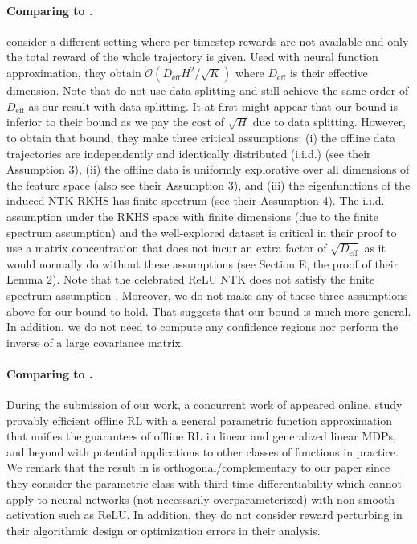 \documentclass{article} \usepackage{iclr2023/iclr2023_conference,times}
\begin{document}
\paragraph{Comparing to \cite{xu2022provably}.} \citet{xu2022provably} consider a different setting where per-timestep rewards are not available and only the total reward of the whole trajectory is given. Used with neural function approximation, they obtain $\tilde{\mathcal{O}}(D_{\textrm{eff}} H^2 / \sqrt{K})$ where $D_{\textrm{eff}}$ is their effective dimension. Note that \citet{xu2022provably} do not use data splitting and still achieve the same order of $D_{\textrm{eff}}$ as our result with data splitting. It at first might appear that our bound is inferior to their bound as we pay the cost of $\sqrt{H}$ due to data splitting. However, to obtain that bound, they make three critical assumptions: (i) the offline data trajectories are independently and identically distributed (i.i.d.) (see their Assumption 3), (ii) the offline data is uniformly explorative over all dimensions of the feature space (also see their Assumption 3), and (iii) the eigenfunctions of the induced NTK RKHS has finite spectrum (see their Assumption 4). The i.i.d. assumption under the RKHS space with finite dimensions (due to the finite spectrum assumption) and the well-explored dataset is critical in their proof to use a matrix concentration that does not incur an extra factor of $\sqrt{D_{\textrm{eff}}}$ as it would normally do without these assumptions (see Section E, the proof of their Lemma 2). Note that the celebrated ReLU NTK does not satisfy the finite spectrum assumption \citep{bietti2019inductive}. Moreover, we do not make any of these three assumptions above for our bound to hold. That suggests that our bound is much more general. In addition, we do not need to compute any confidence regions nor perform the inverse of a large covariance matrix. 

\paragraph{Comparing to \cite{yin2022offline}.} During the submission of our work, a concurrent work of \cite{yin2022offline} appeared online. \citet{yin2022offline} study provably efficient offline RL with a general parametric function approximation that unifies the guarantees of offline RL in linear and generalized linear MDPs, and beyond with potential applications to other classes of functions in practice. We remark that the result in \cite{yin2022offline} is orthogonal/complementary to our paper since they consider the parametric class with third-time differentiability which cannot apply to neural networks (not necessarily overparameterized) with non-smooth activation such as ReLU. In addition, they do not consider reward perturbing in their algorithmic design or optimization errors in their analysis. 
\end{document}
